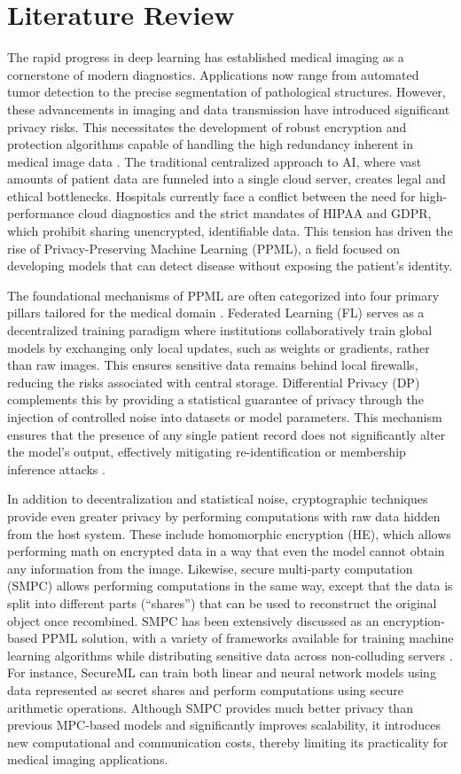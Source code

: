 \documentclass[conference]{IEEEtran}
\begin{document}
\section{Literature Review}
The rapid progress in deep learning has established medical imaging as a cornerstone of modern diagnostics. Applications now range from automated tumor detection to the precise segmentation of pathological structures. However, these advancements in imaging and data transmission have introduced significant privacy risks. This necessitates the development of robust encryption and protection algorithms capable of handling the high redundancy inherent in medical image data \cite{panzade}. The traditional centralized approach to AI, where vast amounts of patient data are funneled into a single cloud server, creates legal and ethical bottlenecks. Hospitals currently face a conflict between the need for high-performance cloud diagnostics and the strict mandates of HIPAA and GDPR, which prohibit sharing unencrypted, identifiable data. This tension has driven the rise of Privacy-Preserving Machine Learning (PPML), a field focused on developing models that can detect disease without exposing the patient's identity.

The foundational mechanisms of PPML are often categorized into four primary pillars tailored for the medical domain \cite{panzade}. Federated Learning (FL) serves as a decentralized training paradigm where institutions collaboratively train global models by exchanging only local updates, such as weights or gradients, rather than raw images. This ensures sensitive data remains behind local firewalls, reducing the risks associated with central storage. Differential Privacy (DP) complements this by providing a statistical guarantee of privacy through the injection of controlled noise into datasets or model parameters. This mechanism ensures that the presence of any single patient record does not significantly alter the model's output, effectively mitigating re-identification or membership inference attacks \cite{panzade}.

In addition to decentralization and statistical noise, cryptographic techniques provide even greater privacy by performing computations with raw data hidden from the host system. These include homomorphic encryption (HE), which allows performing math on encrypted data in a way that even the model cannot obtain any information from the image. Likewise, secure multi-party computation (SMPC) allows performing computations in the same way, except that the data is split into different parts (``shares'') that can be used to reconstruct the original object once recombined. SMPC has been extensively discussed as an encryption-based PPML solution, with a variety of frameworks available for training machine learning algorithms while distributing sensitive data across non-colluding servers \cite{secureml}. For instance, SecureML can train both linear and neural network models using data represented as secret shares and perform computations using secure arithmetic operations. Although SMPC provides much better privacy than previous MPC-based models and significantly improves scalability, it introduces new computational and communication costs, thereby limiting its practicality for medical imaging applications.
\end{document}
